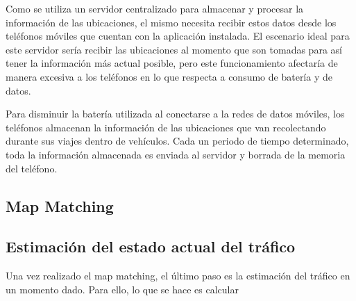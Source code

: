 Como se utiliza un servidor centralizado para almacenar y procesar la información de las ubicaciones, el mismo necesita recibir estos datos desde los teléfonos móviles que cuentan con la aplicación instalada. El escenario ideal para este servidor sería recibir las ubicaciones al momento que son tomadas para así tener la información más actual posible, pero este funcionamiento afectaría de manera excesiva a los teléfonos en lo que respecta a consumo de batería y de datos.

Para disminuir la batería utilizada al conectarse a la redes de datos móviles, los teléfonos almacenan la información de las ubicaciones que van recolectando durante sus viajes dentro de vehículos. Cada un periodo de tiempo determinado, toda la información almacenada es enviada al servidor y borrada de la memoria del teléfono.

\subsection{Map Matching}

\subsection{Estimación del estado actual del tráfico}

Una vez realizado el map matching, el último paso es la estimación del tráfico en un momento dado. Para ello, lo que se hace es calcular 
